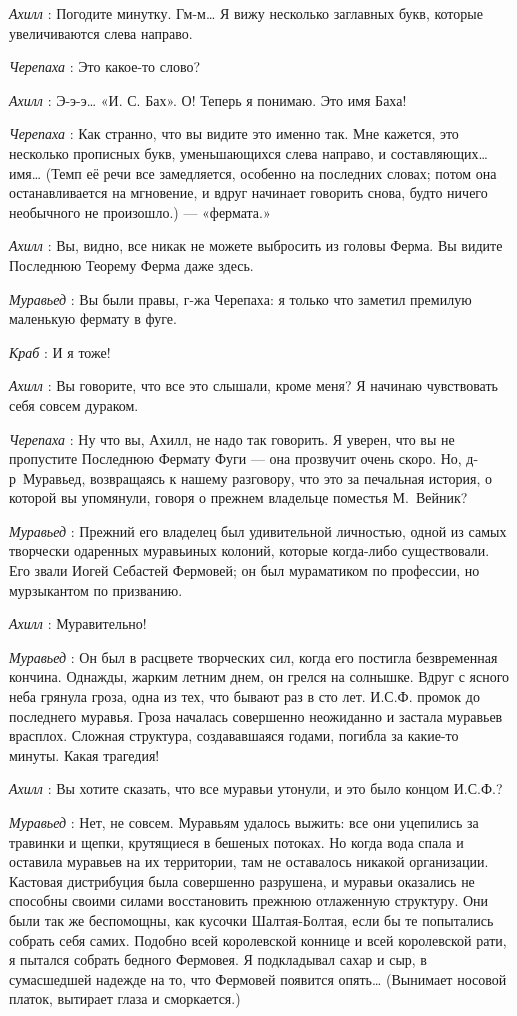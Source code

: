\documentclass[../main.tex]{subfiles}
\begin{document}
\begin{dialogue}
\emph{Ахилл} : Погодите минутку. Гм-м\ldots{} Я вижу несколько заглавных букв, которые увеличиваются слева направо.

\emph{Черепаха} : Это какое-то слово?

\emph{Ахилл} : Э-э-э\ldots{} «И. С. Бах». О! Теперь я понимаю. Это имя Баха!

\emph{Черепаха} : Как странно, что вы видите это именно так. Мне кажется, это несколько прописных букв, уменьшающихся слева направо, и составляющих\ldots{} имя\ldots{} (Темп её речи все замедляется, особенно на последних словах; потом она останавливается на мгновение, и вдруг начинает говорить снова, будто ничего необычного не произошло.) --- «фермата.»

\emph{Ахилл} : Вы, видно, все никак не можете выбросить из головы Ферма. Вы видите Последнюю Теорему Ферма даже здесь.

\emph{Муравьед} : Вы были правы, г-жа Черепаха: я только что заметил премилую маленькую фермату в фуге.

\emph{Краб} : И я тоже!

\emph{Ахилл} : Вы говорите, что все это слышали, кроме меня? Я начинаю чувствовать себя совсем дураком.

\emph{Черепаха} : Ну что вы, Ахилл, не надо так говорить. Я уверен, что вы не пропустите Последнюю Фермату Фуги --- она прозвучит очень скоро. Но, д-р~Муравьед, возвращаясь к нашему разговору, что это за печальная история, о которой вы упомянули, говоря о прежнем владельце поместья М.~Вейник?

\emph{Муравьед} : Прежний его владелец был удивительной личностью, одной из самых творчески одаренных муравьиных колоний, которые когда-либо существовали. Его звали Иогей Себастей Фермовей; он был мураматиком по профессии, но мурзыкантом по призванию.

\emph{Ахилл} : Муравительно!

\emph{Муравьед} : Он был в расцвете творческих сил, когда его постигла безвременная кончина. Однажды, жарким летним днем, он грелся на солнышке. Вдруг с ясного неба грянула гроза, одна из тех, что бывают раз в сто лет. И.С.Ф. промок до последнего муравья. Гроза началась совершенно неожиданно и застала муравьев врасплох. Сложная структура, создававшаяся годами, погибла за какие-то минуты. Какая трагедия!

\emph{Ахилл} : Вы хотите сказать, что все муравьи утонули, и это было концом И.С.Ф.?

\emph{Муравьед} : Нет, не совсем. Муравьям удалось выжить: все они уцепились за травинки и щепки, крутящиеся в бешеных потоках. Но когда вода спала и оставила муравьев на их территории, там не оставалось никакой организации. Кастовая дистрибуция была совершенно разрушена, и муравьи оказались не способны своими силами восстановить прежнюю отлаженную структуру. Они были так же беспомощны, как кусочки Шалтая-Болтая, если бы те попытались собрать себя самих. Подобно всей королевской коннице и всей королевской рати, я пытался собрать бедного Фермовея. Я подкладывал сахар и сыр, в сумасшедшей надежде на то, что Фермовей появится опять\ldots{} (Вынимает носовой платок, вытирает глаза и сморкается.)


\end{dialogue}
\end{document}
